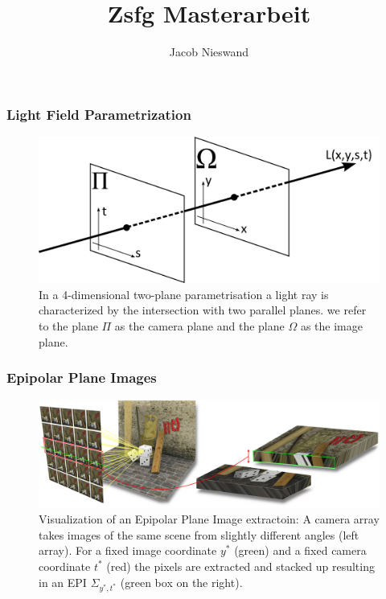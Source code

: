 \documentclass[11pt]{beamer}
\begin{document}
	\author{Jacob Nieswand}
	\title{Zsfg Masterarbeit}
	\begin{frame}[plain]
	\maketitle
\end{frame}

\begin{frame}
\frametitle{Light Field Parametrization}
\begin{figure}[h]
	\centering
	\includegraphics[width=0.7\linewidth]{images/twoplane_param}
	\caption[Two-plane parametrisation]{In a 4-dimensional two-plane parametrisation a light ray is characterized by the intersection with two parallel planes. we refer to the plane  $\Pi$ as the camera plane and the plane $\Omega$ as the image plane.}
	\label{fig:twoplaneparam}
\end{figure}
\end{frame}
 \begin{frame}
 	\frametitle{Epipolar Plane Images}
 	\begin{figure}
 		\centering
 		\includegraphics[width=1\linewidth]{images/epiVisualization}
 		\caption[Visualization of an EPI extraction]{Visualization of an Epipolar Plane Image extractoin: A camera array takes images of the same scene from slightly different angles (left array). For a fixed image coordinate $y^*$ (green) and a fixed camera coordinate $t^*$ (red) the pixels are extracted and stacked up resulting in an EPI $\Sigma_{y^*, t^*}$ (green box on the right).}
 		\label{fig:epivisualization}
 	\end{figure}
 	
 \end{frame}
\end{document}
